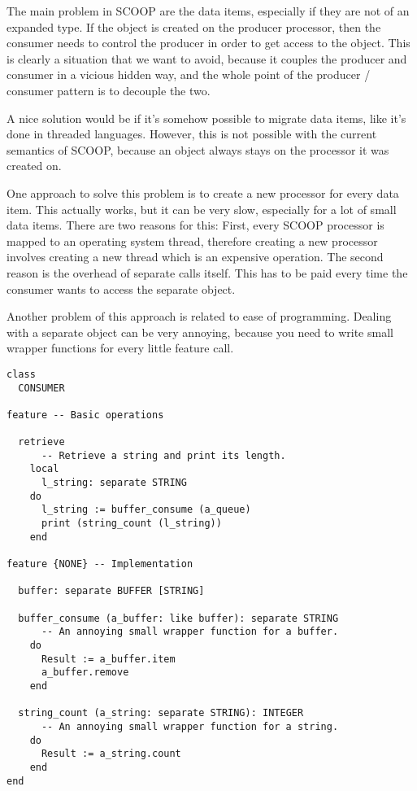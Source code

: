 \documentclass[a4paper,10pt]{report}
\begin{document}
The main problem in SCOOP are the data items, especially if they are not of an expanded type.
If the object is created on the producer processor, then the consumer needs to control the producer in order to get access to the object.
This is clearly a situation that we want to avoid, because it couples the producer and consumer in a vicious hidden way, and the whole point of the producer / consumer pattern is to decouple the two.

A nice solution would be if it's somehow possible to migrate data items, like it's done in threaded languages.
However, this is not possible with the current semantics of SCOOP, because an object always stays on the processor it was created on.

One approach to solve this problem is to create a new processor for every data item.
This actually works, but it can be very slow, especially for a lot of small data items.
There are two reasons for this:
First, every SCOOP processor is mapped to an operating system thread, therefore creating a new processor involves creating a new thread which is an expensive operation.
The second reason is the overhead of separate calls itself.
This has to be paid every time the consumer wants to access the separate object.

Another problem of this approach is related to ease of programming.
Dealing with a separate object can be very annoying, because you need to write small wrapper functions for every little feature call.

\begin{lstlisting}
class
  CONSUMER

feature -- Basic operations
  
  retrieve
      -- Retrieve a string and print its length.
    local
      l_string: separate STRING
    do
      l_string := buffer_consume (a_queue)
      print (string_count (l_string))
    end
    
feature {NONE} -- Implementation
  
  buffer: separate BUFFER [STRING]

  buffer_consume (a_buffer: like buffer): separate STRING
      -- An annoying small wrapper function for a buffer.
    do
      Result := a_buffer.item
      a_buffer.remove
    end
    
  string_count (a_string: separate STRING): INTEGER
      -- An annoying small wrapper function for a string.
    do
      Result := a_string.count
    end
end
\end{lstlisting}
\end{document}
